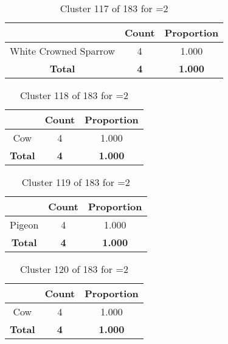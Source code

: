 \begin{table}[ht!]
\centering
\begin{tabular}{|c|c|c|}
\hline
\bf \Spec{} &\bf Count &\bf Proportion\\ \hline \hline
White Crowned Sparrow & 4 & 1.000\\ \hline
\hline
\bf Total & \bf 4 & \bf 1.000\\ \hline
\end{tabular}
\label{tab:cluster:117:2}
\caption{Cluster 117 of 183 for \minneigh{}=2}
\end{table}

\begin{table}[ht!]
\centering
\begin{tabular}{|c|c|c|}
\hline
\bf \Spec{} &\bf Count &\bf Proportion\\ \hline \hline
Cow & 4 & 1.000\\ \hline
\hline
\bf Total & \bf 4 & \bf 1.000\\ \hline
\end{tabular}
\label{tab:cluster:118:2}
\caption{Cluster 118 of 183 for \minneigh{}=2}
\end{table}

\begin{table}[ht!]
\centering
\begin{tabular}{|c|c|c|}
\hline
\bf \Spec{} &\bf Count &\bf Proportion\\ \hline \hline
Pigeon & 4 & 1.000\\ \hline
\hline
\bf Total & \bf 4 & \bf 1.000\\ \hline
\end{tabular}
\label{tab:cluster:119:2}
\caption{Cluster 119 of 183 for \minneigh{}=2}
\end{table}

\clearpage
\begin{table}[ht!]
\centering
\begin{tabular}{|c|c|c|}
\hline
\bf \Spec{} &\bf Count &\bf Proportion\\ \hline \hline
Cow & 4 & 1.000\\ \hline
\hline
\bf Total & \bf 4 & \bf 1.000\\ \hline
\end{tabular}
\label{tab:cluster:120:2}
\caption{Cluster 120 of 183 for \minneigh{}=2}
\end{table}

